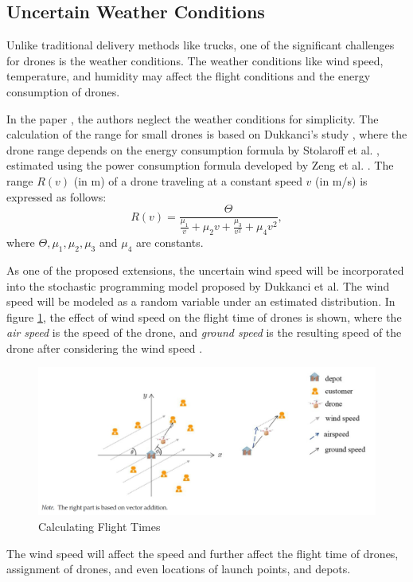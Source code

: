 \documentclass{lxaiproposal}
\begin{document}
\subsection{Uncertain Weather Conditions}
\vspace*{-1mm}
Unlike traditional delivery methods like trucks, one of the significant challenges for drones is the weather conditions. The weather conditions like wind speed, temperature, and humidity may affect the flight conditions and the energy consumption of drones.


In the paper \cite{dukkanci2023drones}, the authors neglect the weather conditions for simplicity. The calculation of the range for small drones is based on Dukkanci's study \cite{dukkanci2021minimizing}, where the drone range depends on the energy consumption formula by Stolaroff et al. \cite{stolaroff2018energy}, estimated using the power consumption formula developed by Zeng et al. \cite{zeng2019energy}. The range $R(v)$ (in m) of a drone traveling at a constant speed $v$ (in m/s) is expressed as follows:
\begin{equation}
    R(v) = \frac{\Theta}{\frac{\mu_1}{v} + \mu_2 v + \frac{\mu_3}{v^2} + \mu_4 v^2}, \label{eq:range_formula}
\end{equation}
where $\Theta, \mu_1, \mu_2, \mu_3$ and $\mu_4$ are constants.


As one of the proposed extensions, the uncertain wind speed will be incorporated into the stochastic programming model proposed by Dukkanci et al. The wind speed will be modeled as a random variable under an estimated distribution. In figure \ref*{fig:wind_speed}, the effect of wind speed on the flight time of drones is shown, where the \textit{air speed} is the speed of the drone, and \textit{ground speed} is the resulting speed of the drone after considering the wind speed \cite{cheng2024robust}.
\begin{figure} [h!]
    \centering
    \includegraphics[width=1\linewidth]{figure_windspeed.png}
    \caption{Calculating Flight Times \cite{cheng2024robust}}
    \label{fig:wind_speed}
\end{figure}
The wind speed will affect the speed and further affect the flight time of drones, assignment of drones, and even locations of launch points, and depots.
\end{document}
